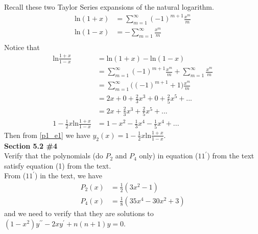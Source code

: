 \documentclass[12pt]{article}
\newcommand{\problem}[1]{\hspace{-4 ex} \large \textbf{#1}\\}
\begin{document}
	Recall these two Taylor Series expansions of the natural logarithm. \\
	\begin{align*}
		\text{ln}(1+x) & = \sum\limits_{m=1}^\infty (-1)^{m+1} \frac{x^m}{m}\\
		\text{ln}(1-x) & = -\sum\limits_{m=1}^\infty \frac{x^m}{m}\\
	\end{align*}
	Notice that
	\begin{align*}
		\text{ln}\frac{1+x}{1-x} & = \text{ln}(1+x) - \text{ln}(1-x) \\
		& = \sum\limits_{m=1}^\infty (-1)^{m+1} \frac{x^m}{m} + \sum\limits_{m=1}^\infty \frac{x^m}{m} \\
		& = \sum\limits_{m=1}^\infty \big( (-1)^{m+1} + 1 \big) \frac{x^m}{m} \\
		& = 2x + 0 + \frac{2}{3}x^3 + 0 + \frac{2}{5}x^5 + ... \\
		& = 2x + \frac{2}{3}x^3 + \frac{2}{5}x^5 + ... \\
		1 - \frac{1}{2}x\text{ln}\frac{1+x}{1-x}& = 1 -x^2 - \frac{1}{3}x^4 - \frac{1}{5}x^4 + ...
	\end{align*}
	Then from \ref{p1_e1} we have $y_2(x) = 1 - \frac{1}{2}x\text{ln}\frac{1+x}{1-x}$. \\
	
\problem{Section 5.2 \#4} Verify that the polynomials (do $P_2$ and $P_4$ only) in equation ($11^\prime$) from the text satisfy equation (1) from the text. \\

	From ($11^\prime$) in the text, we have
	\begin{align*}
		P_2(x) & = \frac{1}{2}(3x^2-1) \\
		P_4(x) & = \frac{1}{8}(35x^4-30x^2+3) 
	\end{align*}
	and we need to verify that they are solutions to $(1-x^2)y^{\prime\prime} - 2xy^\prime + n(n+1)y=0$. 
	
\end{document}
